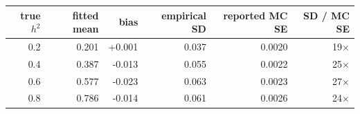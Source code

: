 \begin{tabular}{rrrrrr}
\toprule
true $h^2$ & fitted mean & bias & empirical SD & reported MC SE & SD / MC SE \\
\midrule
0.2 & 0.201 & +0.001 & 0.037 & 0.0020 & 19$\times$ \\
0.4 & 0.387 & -0.013 & 0.055 & 0.0022 & 25$\times$ \\
0.6 & 0.577 & -0.023 & 0.063 & 0.0023 & 27$\times$ \\
0.8 & 0.786 & -0.014 & 0.061 & 0.0026 & 24$\times$ \\
\bottomrule
\end{tabular}
